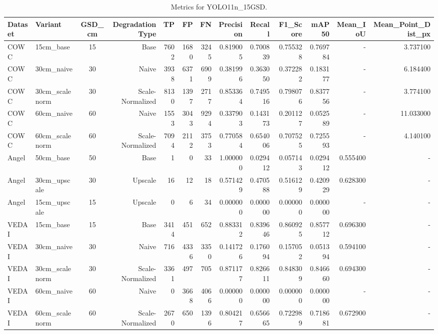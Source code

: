 \begin{table}
\caption{Metrics for YOLO11n_15GSD.}
\label{tab:rq1_results}
\begin{tabular}{llcrrrrrrrrrr}
\toprule
Dataset & Variant & GSD_cm & DegradationType & TP & FP & FN & Precision & Recall & F1_Score & mAP50 & Mean_IoU & Mean_Point_Dist_px \\
\midrule
COWC & 15cm_base & 15 & Base & 7602 & 1680 & 3245 & 0.819005 & 0.700839 & 0.755328 & 0.769784 & - & 3.737100 \\
COWC & 30cm_naive & 30 & Naive & 3938 & 6371 & 6909 & 0.381996 & 0.363050 & 0.372282 & 0.183177 & - & 6.184400 \\
COWC & 30cm_scalenorm & 30 & Scale-Normalized & 8130 & 1397 & 2717 & 0.853364 & 0.749516 & 0.798076 & 0.837756 & - & 3.774100 \\
COWC & 60cm_naive & 60 & Naive & 1553 & 3043 & 9294 & 0.337903 & 0.143173 & 0.201127 & 0.052589 & - & 11.033000 \\
COWC & 60cm_scalenorm & 60 & Scale-Normalized & 7094 & 2112 & 3753 & 0.770584 & 0.654006 & 0.707525 & 0.725593 & - & 4.140100 \\
Angel & 50cm_base & 50 & Base & 1 & 0 & 33 & 1.000000 & 0.029412 & 0.057143 & 0.029412 & 0.555400 & - \\
Angel & 30cm_upscale & 30 & Upscale & 16 & 12 & 18 & 0.571429 & 0.470588 & 0.516129 & 0.420929 & 0.628300 & - \\
Angel & 15cm_upscale & 15 & Upscale & 0 & 6 & 34 & 0.000000 & 0.000000 & 0.000000 & 0.000000 & - & - \\
VEDAI & 15cm_base & 15 & Base & 3414 & 451 & 652 & 0.883312 & 0.839646 & 0.860925 & 0.857712 & 0.696300 & - \\
VEDAI & 30cm_naive & 30 & Naive & 716 & 4336 & 3350 & 0.141726 & 0.176094 & 0.157052 & 0.051394 & 0.594100 & - \\
VEDAI & 30cm_scalenorm & 30 & Scale-Normalized & 3361 & 497 & 705 & 0.871177 & 0.826611 & 0.848309 & 0.846660 & 0.694300 & - \\
VEDAI & 60cm_naive & 60 & Naive & 0 & 3668 & 4066 & 0.000000 & 0.000000 & 0.000000 & 0.000000 & - & - \\
VEDAI & 60cm_scalenorm & 60 & Scale-Normalized & 2670 & 650 & 1396 & 0.804217 & 0.656665 & 0.722989 & 0.718681 & 0.672900 & - \\
\bottomrule
\end{tabular}
\end{table}
